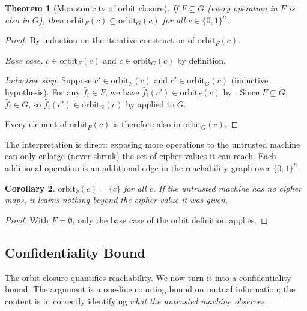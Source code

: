 \documentclass[11pt]{article}
\theoremstyle{definition}
\theoremstyle{plain}
\newtheorem{theorem}{Theorem}[section]
\newtheorem{corollary}[theorem]{Corollary}
\theoremstyle{remark}
\newcommand{\fhat}{\hat{f}}
\newcommand{\orbitF}{\mathrm{orbit}_F}
\newcommand{\B}{\{0,1\}}
\begin{document}
\begin{theorem}[Monotonicity of orbit closure]
\label{thm:monotonicity}
If $F \subseteq G$ (every operation in $F$ is also in $G$), then
$\orbitF(c) \subseteq \mathrm{orbit}_G(c)$ for all $c \in \B^n$.
\end{theorem}

\begin{proof}
By induction on the iterative construction of $\orbitF(c)$.

\emph{Base case.} $c \in \orbitF(c)$ and $c \in \mathrm{orbit}_G(c)$
by definition.

\emph{Inductive step.} Suppose $c' \in \orbitF(c)$ and $c' \in
\mathrm{orbit}_G(c)$ (inductive hypothesis).
For any $\fhat_i \in F$, we have $\fhat_i(c') \in \orbitF(c)$ by
.
Since $F \subseteq G$, $\fhat_i \in G$, so
$\fhat_i(c') \in \mathrm{orbit}_G(c)$ by  applied to $G$.

Every element of $\orbitF(c)$ is therefore also in $\mathrm{orbit}_G(c)$.
\end{proof}

The interpretation is direct: exposing more operations to the untrusted
machine can only enlarge (never shrink) the set of cipher values it can
reach.
Each additional operation is an additional edge in the reachability graph
over $\B^n$.

\begin{corollary}
\label{cor:empty-ops}
$\mathrm{orbit}_\emptyset(c) = \{c\}$ for all $c$.
If the untrusted machine has no cipher maps, it learns nothing beyond the
cipher value it was given.
\end{corollary}

\begin{proof}
With $F = \emptyset$, only the base case of the orbit definition applies.
\end{proof}


\subsection{Confidentiality Bound}
\label{sec:conf-bound}

The orbit closure quantifies reachability.
We now turn it into a confidentiality bound.
The argument is a one-line counting bound on mutual information; the
content is in correctly identifying \emph{what the untrusted machine
observes}.
\end{document}
